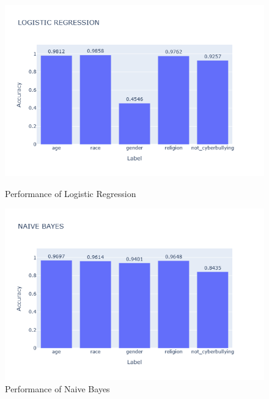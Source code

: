 \documentclass[pdflatex,sn-mathphys-num]{sn-jnl}%
\theoremstyle{thmstyleone}%
\theoremstyle{thmstyletwo}%
\theoremstyle{thmstylethree}%
\begin{document}
\begin{figure}[H]
    \begin{minipage}{0.48\textwidth}
        \centering
        \includegraphics[width=\textwidth]{Graphs/LOGISTIC REGRESSION.png}
        \caption{Performance of Logistic Regression}
        \label{fig:logistic_regression}
    \end{minipage}
    \hfill
    \begin{minipage}{0.48\textwidth}
        \centering
        \includegraphics[width=\textwidth]{Graphs/NAIVE BAYES.png}
        \caption{Performance of Naive Bayes}
        \label{fig:naive_bayes}
    \end{minipage}
\end{figure}
\end{document}
